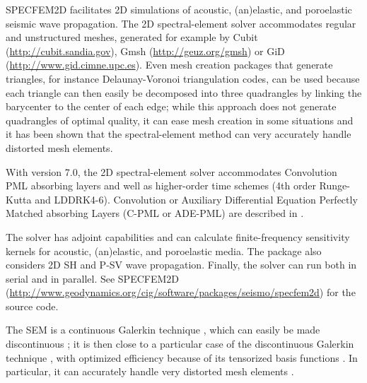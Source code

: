 \documentclass[oneside,english,onecolumn,letterpaper]{book}
\newcommand{\urlwithparentheses}[1]{(\url{#1})}
\begin{document}
SPECFEM2D facilitates 2D simulations of
acoustic, (an)elastic, and poroelastic seismic wave propagation.
The 2D spectral-element solver accommodates
regular and unstructured meshes, generated for example by Cubit
\urlwithparentheses{http://cubit.sandia.gov},
Gmsh \urlwithparentheses{http://geuz.org/gmsh}
or GiD \urlwithparentheses{http://www.gid.cimne.upc.es}.
Even mesh creation packages that generate triangles, for instance Delaunay-Voronoi triangulation codes, can be used because each triangle can then easily be decomposed into three quadrangles by linking the barycenter to the center of each edge; while this approach does not generate quadrangles of optimal quality, it can ease mesh creation in some situations and it has been shown that the spectral-element method can very accurately handle distorted mesh elements.

With version 7.0, the 2D spectral-element solver accommodates Convolution PML absorbing layers and well as higher-order time schemes
(4th order Runge-Kutta and LDDRK4-6).
Convolution or Auxiliary Differential Equation Perfectly Matched absorbing Layers (C-PML or ADE-PML)
are described in \cite{MaKoEz08,MaKoGe08,MaKo09,MaKoGeBr10,KoMa07}.

The solver has adjoint capabilities and can
calculate finite-frequency sensitivity kernels \citep{TrKoLi08,PeKoLuMaLeCaLeMaLiBlNiBaTr11} for acoustic,
(an)elastic, and poroelastic media. The package also considers 2D SH
and P-SV wave propagation. Finally, the solver can run
both in serial and in parallel. See SPECFEM2D
\urlwithparentheses{http://www.geodynamics.org/cig/software/packages/seismo/specfem2d}
for the source code.

The SEM is a continuous Galerkin technique \citep{TrKoLi08,PeKoLuMaLeCaLeMaLiBlNiBaTr11}, which can easily be made discontinuous \citep{BeMaPa94,Ch00,KoWoHu02,ChCaVi03,LaWaBe05,Kop06,WiStBuGh10,AcKo11}; it is then close to a particular case of the discontinuous Galerkin technique \citep{ReHi73,LeRa74,Arn82,JoPi86,BoMaHe91,FaRi99,HuHuRa99,CoKaSh00,GiHeWa02,RiWh03,MoRi05,GrScSc06,AiMoMu06,BeLaPi06,DuKa06,DeSeWh08,PuAmKa09,WiStBuGh10,DeSe10,EtChViGl10}, with optimized efficiency because of its tensorized basis functions \citep{WiStBuGh10,AcKo11}.
In particular, it can accurately handle very distorted mesh elements \citep{OlSe11}.
\end{document}
